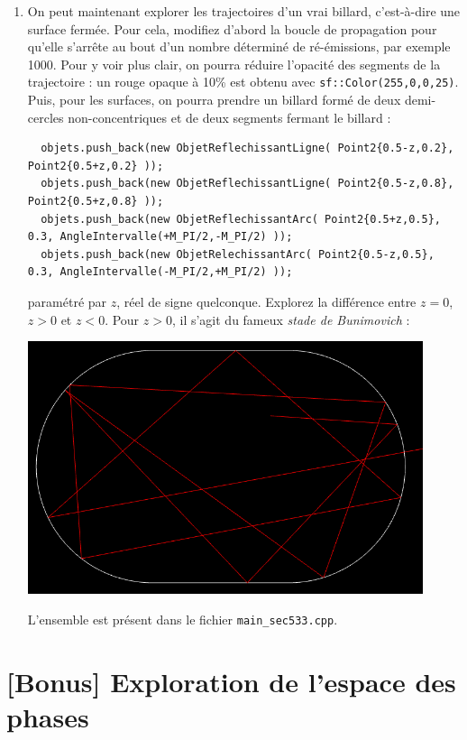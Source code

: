 \documentclass{book}
\newcommand{\inline}[1]{\texttt{#1}}
\def\filename{\texttt}
\begin{document}
\begin{enumerate}
  \item On peut maintenant explorer les trajectoires d'un vrai billard, c'est-à-dire une surface fermée. Pour cela, modifiez d'abord la boucle de propagation pour qu'elle s'arrête au bout d'un nombre déterminé de ré-émissions, par exemple 1000. Pour y voir plus clair, on pourra réduire l'opacité des segments de la trajectoire : un rouge opaque à 10\% est obtenu avec \inline{sf::Color(255,0,0,25)}. Puis, pour les surfaces, on pourra prendre un billard formé de deux demi-cercles non-concentriques et de deux segments fermant le billard :
  \begin{verbatim}
  objets.push_back(new ObjetReflechissantLigne( Point2{0.5-z,0.2}, Point2{0.5+z,0.2} ));
  objets.push_back(new ObjetReflechissantLigne( Point2{0.5-z,0.8}, Point2{0.5+z,0.8} ));
  objets.push_back(new ObjetReflechissantArc( Point2{0.5+z,0.5}, 0.3, AngleIntervalle(+M_PI/2,-M_PI/2) ));
  objets.push_back(new ObjetRelechissantArc( Point2{0.5-z,0.5}, 0.3, AngleIntervalle(-M_PI/2,+M_PI/2) ));
  \end{verbatim}
  paramétré par $z$, réel de signe quelconque. Explorez la différence entre $z=0$, $z>0$ et $z<0$. Pour $z>0$, il s'agit du fameux \emph{stade de Bunimovich} :
  \begin{center}
  \includegraphics[height=20em]{TD5/bunimovich-stadium.png}
  \end{center}

\begin{correction}
L'ensemble est présent dans le fichier \filename{main\_sec533.cpp}.
\end{correction}

\end{enumerate}

\section{[Bonus] Exploration de l'espace des phases}
\end{document}
